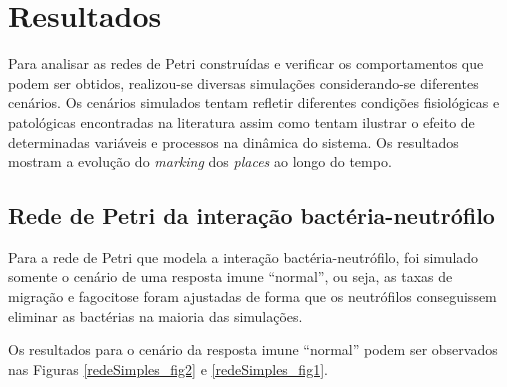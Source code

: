 \documentclass[a4paper,10pt]{article}
\begin{document}
	
	\section{Resultados}
	
		Para analisar as redes de Petri construídas e verificar os comportamentos que podem ser obtidos, realizou-se diversas simulações considerando-se 
		diferentes cenários. Os cenários simulados tentam refletir diferentes condições fisiológicas e patológicas encontradas na literatura assim como 
		tentam ilustrar o efeito de determinadas variáveis e processos na dinâmica do sistema. 
		Os resultados mostram a evolução do \textit{marking} dos \textit{places} ao longo do tempo. 
	
		\subsection{Rede de Petri da interação bactéria-neutrófilo} 
		
		Para a rede de Petri que modela a interação bactéria-neutrófilo, foi simulado somente o cenário de uma 
		resposta imune ``normal'', ou seja, as taxas de migração e fagocitose foram ajustadas de forma que os 
		neutrófilos conseguissem eliminar as bactérias na maioria das simulações. 
		
		Os resultados para o cenário da resposta imune ``normal'' podem ser observados nas Figuras \ref{redeSimples_fig2} 
		e \ref{redeSimples_fig1}.		
		
\end{document}
